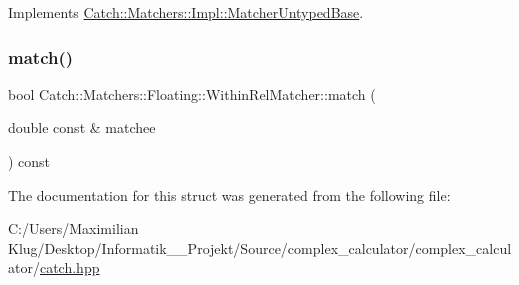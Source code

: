 Implements \mbox{\hyperlink{class_catch_1_1_matchers_1_1_impl_1_1_matcher_untyped_base_a91d3a907dbfcbb596077df24f6e11fe2}{Catch\+::\+Matchers\+::\+Impl\+::\+Matcher\+Untyped\+Base}}.

\mbox{\label{struct_catch_1_1_matchers_1_1_floating_1_1_within_rel_matcher_ac4fc68ff316028137a6d940e10d78e12}} 
\subsubsection{\texorpdfstring{match()}{match()}}
{\footnotesize\ttfamily bool Catch\+::\+Matchers\+::\+Floating\+::\+Within\+Rel\+Matcher\+::match (\begin{DoxyParamCaption}\item[{double const \&}]{matchee }\end{DoxyParamCaption}) const\hspace{0.3cm}{\ttfamily [override]}}



The documentation for this struct was generated from the following file\+:\begin{DoxyCompactItemize}
\item 
C\+:/\+Users/\+Maximilian Klug/\+Desktop/\+Informatik\+\_\+\_\+\+Projekt/\+Source/complex\+\_\+calculator/complex\+\_\+calculator/\mbox{\hyperlink{catch_8hpp}{catch.\+hpp}}\end{DoxyCompactItemize}
